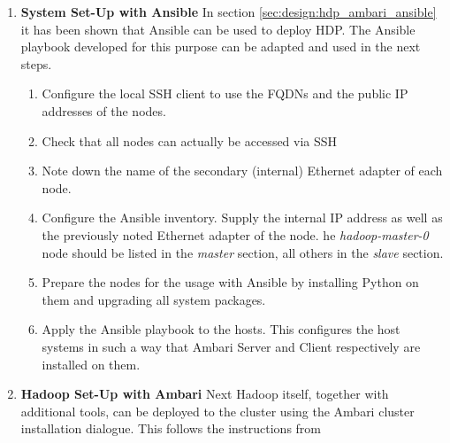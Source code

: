 \begin{enumerate}
    
    \item \textbf{System Set-Up with Ansible} 
    In section \vref{sec:design:hdp_ambari_ansible} it has been shown that Ansible can be used to deploy \ac{HDP}. The Ansible playbook developed for this purpose can be adapted and used in the next steps.
    \begin{enumerate}
        \item Configure the local \ac{SSH} client to use the \acp{FQDN} and the public \ac{IP} addresses of the nodes. 
        \item Check that all nodes can actually be accessed via \ac{SSH}
        \item Note down the name of the secondary (internal) Ethernet adapter of each node.
        \item Configure the Ansible inventory. Supply the internal \ac{IP} address as well as the previously noted Ethernet adapter of the node. he \emph{hadoop-master-0} node should be listed in the \emph{master} section, all others in the \emph{slave} section.
        \item Prepare the nodes for the usage with Ansible by installing Python on them and upgrading all system packages.
        \item Apply the Ansible playbook to the hosts.
        This configures the host systems in such a way that Ambari Server and Client respectively are installed on them.
    \end{enumerate}
    
    \item \textbf{Hadoop Set-Up with Ambari} 
    Next Hadoop itself, together with additional tools, can be deployed to the cluster using the Ambari cluster installation dialogue. This follows the instructions from \autocite[][Chap.~6]{hortonworks2018install}
    

\end{enumerate}
